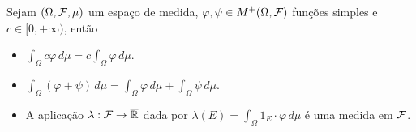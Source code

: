 \begin{lema}\label{lema-lin-int-funcao-simples-positiva}
Sejam $(\Omega,\mathcal{F},\mu)$ um espaço de medida, 
$\varphi,\psi \in M^+(\Omega,\mathcal{F})$ 
funções simples e $c\in [0,+\infty)$,
então
\begin{itemize}
	\item[a)]
	\(\displaystyle 
		\int_{\Omega} c\varphi\, d\mu
		=
		c\int_{\Omega} \varphi \, d\mu.
	\)
	

	\item[b)]
	\(\displaystyle 
		\int_{\Omega} (\varphi+\psi)\, d\mu
		=
		\int_{\Omega} \varphi \, d\mu
		+
		\int_{\Omega} \psi \, d\mu.
	\)
	
	\item[c)] A aplicação $\lambda:\mathcal{F}\to\overline{\mathbb{R}}$
	dada por 
		\(\displaystyle
			\lambda(E) = \int_{\Omega} 1_{E}\cdot \varphi\, d\mu
		\)
	é uma medida em $\mathcal{F}$.
\end{itemize}
\end{lema}



